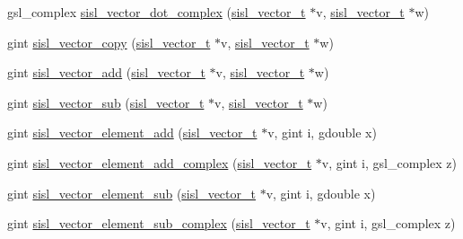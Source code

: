 \begin{DoxyCompactItemize}
\item 
gsl\+\_\+complex \mbox{\hyperlink{group__vector_ga6e86d7ca00a219dc151ea78a6c904014}{sisl\+\_\+vector\+\_\+dot\+\_\+complex}} (\mbox{\hyperlink{group__vector_gacbac585492f5005f05f0c0b8463039be}{sisl\+\_\+vector\+\_\+t}} $\ast$v, \mbox{\hyperlink{group__vector_gacbac585492f5005f05f0c0b8463039be}{sisl\+\_\+vector\+\_\+t}} $\ast$w)
\item 
gint \mbox{\hyperlink{group__vector_ga782dc0e416aadf242dc5c06d5c078347}{sisl\+\_\+vector\+\_\+copy}} (\mbox{\hyperlink{group__vector_gacbac585492f5005f05f0c0b8463039be}{sisl\+\_\+vector\+\_\+t}} $\ast$v, \mbox{\hyperlink{group__vector_gacbac585492f5005f05f0c0b8463039be}{sisl\+\_\+vector\+\_\+t}} $\ast$w)
\item 
gint \mbox{\hyperlink{group__vector_ga95c714975c15dc45106e0b46d698686f}{sisl\+\_\+vector\+\_\+add}} (\mbox{\hyperlink{group__vector_gacbac585492f5005f05f0c0b8463039be}{sisl\+\_\+vector\+\_\+t}} $\ast$v, \mbox{\hyperlink{group__vector_gacbac585492f5005f05f0c0b8463039be}{sisl\+\_\+vector\+\_\+t}} $\ast$w)
\item 
gint \mbox{\hyperlink{group__vector_ga9232cbb2dbb276abbbc39afe02d939f5}{sisl\+\_\+vector\+\_\+sub}} (\mbox{\hyperlink{group__vector_gacbac585492f5005f05f0c0b8463039be}{sisl\+\_\+vector\+\_\+t}} $\ast$v, \mbox{\hyperlink{group__vector_gacbac585492f5005f05f0c0b8463039be}{sisl\+\_\+vector\+\_\+t}} $\ast$w)
\item 
gint \mbox{\hyperlink{group__vector_ga60a3b5d4b7639a5b51fbb2a7d09f4b79}{sisl\+\_\+vector\+\_\+element\+\_\+add}} (\mbox{\hyperlink{group__vector_gacbac585492f5005f05f0c0b8463039be}{sisl\+\_\+vector\+\_\+t}} $\ast$v, gint i, gdouble x)
\item 
gint \mbox{\hyperlink{group__vector_ga1314197af0655485fe81bbd14e92482b}{sisl\+\_\+vector\+\_\+element\+\_\+add\+\_\+complex}} (\mbox{\hyperlink{group__vector_gacbac585492f5005f05f0c0b8463039be}{sisl\+\_\+vector\+\_\+t}} $\ast$v, gint i, gsl\+\_\+complex z)
\item 
gint \mbox{\hyperlink{group__vector_gab178a51567a77d4b40e23ab0511aa2ee}{sisl\+\_\+vector\+\_\+element\+\_\+sub}} (\mbox{\hyperlink{group__vector_gacbac585492f5005f05f0c0b8463039be}{sisl\+\_\+vector\+\_\+t}} $\ast$v, gint i, gdouble x)
\item 
gint \mbox{\hyperlink{group__vector_gaab6e862963fb72b8578a56973094ef76}{sisl\+\_\+vector\+\_\+element\+\_\+sub\+\_\+complex}} (\mbox{\hyperlink{group__vector_gacbac585492f5005f05f0c0b8463039be}{sisl\+\_\+vector\+\_\+t}} $\ast$v, gint i, gsl\+\_\+complex z)

\end{DoxyCompactItemize}
